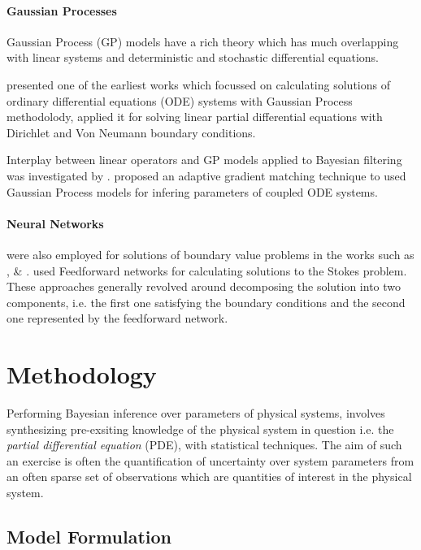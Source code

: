 \documentclass{article}
\begin{document}
\paragraph{Gaussian Processes}

Gaussian Process (GP) models \citep{Rasmussen:2005:GPM:1162254} have a rich theory which has much overlapping with linear systems and deterministic and stochastic differential equations. 

\citet{Skilling1992} presented one of the earliest works which focussed on calculating solutions of ordinary differential equations (ODE) systems with Gaussian Process methodolody, \citet{Graepel} applied it for solving linear partial differential equations with Dirichlet and Von Neumann boundary conditions.

Interplay between linear operators and GP models applied to Bayesian filtering was investigated by \citet{Sarkka2011}. \citet{pmlr-v31-dondelinger13a} proposed an adaptive gradient matching technique to used Gaussian Process models for infering parameters of coupled ODE systems.

\paragraph{Neural Networks} were also employed for solutions of boundary value problems in the works such as \citet{Lagaris}, \citet{Aarts2001} \&  \citet{TSOULOS20092385}. \citet{Baymani2011} used Feedforward networks for calculating solutions to the Stokes problem. These approaches generally revolved around decomposing the solution into two components, i.e. the first one satisfying the boundary conditions and the second one represented by the feedforward network.

\section{Methodology}

Performing Bayesian inference over parameters of physical systems,
involves synthesizing pre-exsiting knowledge of the physical system in
question i.e. the \emph{partial differential equation} (PDE), with
statistical techniques. The aim of such an exercise is often the
quantification of uncertainty over system parameters from an often
sparse set of observations which are quantities of interest in the
physical system. 


\subsection{Model Formulation}
\end{document}
